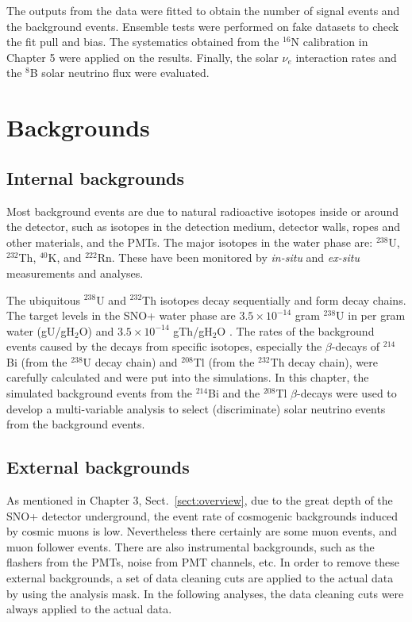 The outputs from the data were fitted to obtain the number of signal events and the background events. Ensemble tests were performed on fake datasets to check the fit pull and bias. The systematics obtained from the $^{16}$N calibration in Chapter 5 were applied on the results. Finally, the solar $\nu_e$ interaction rates and the $^8$B solar neutrino flux were evaluated.

\section{Backgrounds}

\subsection{Internal backgrounds}

Most background events are due to natural radioactive isotopes inside or around the detector, such as isotopes in the detection medium, detector walls, ropes and other materials, and the PMTs. The major isotopes in the water phase are: $^{238}$U, $^{232}$Th, $^{40}$K, and $^{222}$Rn. These have been monitored by \emph{in-situ} and \emph{ex-situ} measurements and analyses. 

The ubiquitous $^{238}$U and $^{232}$Th isotopes decay sequentially and form decay chains. 
The target levels in the SNO+ water phase are $3.5\times 10^{-14}$ gram $^{238}$U in per gram water (gU/gH$_2$O) and $3.5\times 10^{-14}$ gTh/gH$_2$O \cite{waterunidoc}. The rates of the background events caused by the decays from specific isotopes, especially the $\beta$-decays of $^{214}$Bi (from the $^{238}$U decay chain) and $^{208}$Tl (from the $^{232}$Th decay chain), were carefully calculated and were put into the simulations. In this chapter, the simulated background events from the $^{214}$Bi and the $^{208}$Tl $\beta$-decays were used to develop a multi-variable analysis to select (discriminate) solar neutrino events from the background events.

\subsection{External backgrounds}

As mentioned in Chapter 3, Sect.~\ref{sect:overview}, due to the great depth of the SNO+ detector underground, the event rate of cosmogenic backgrounds induced by cosmic muons is low. Nevertheless there certainly are some muon events, and muon follower events. There are also instrumental backgrounds, such as the flashers from the PMTs, noise from PMT channels, etc. In order to remove these external backgrounds, a set of data cleaning cuts are applied to the actual data by using the analysis mask. In the following analyses, the data cleaning cuts were always applied to the actual data.

